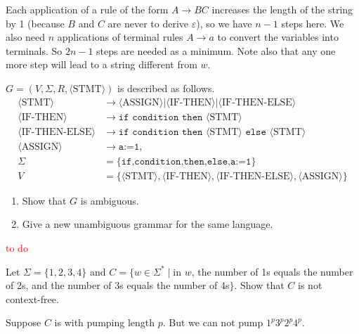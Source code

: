 Each application of a rule of the form $A\to BC$ increases the length of the string by 1 (because $B$ and $C$ are never to derive $\varepsilon$), so we have $n-1$ steps here. We also need $n$ applications of terminal rules $A\to a$ to convert the variables into terminals. So $2n-1$ steps are needed as a minimum. Note also that any one more step will lead to a string different from $w$.

\begin{exercise}{2.27}
  $G=(V,\Sigma,R,\langle \text{STMT}\rangle)$ is described as follows.
  \begin{align*}
    \langle \text{STMT}\rangle         & \rightarrow\langle \text{ASSIGN}\rangle|\langle \text{IF-THEN}\rangle|\langle \text{IF-THEN-ELSE}\rangle                  \\
    \langle \text{IF-THEN}\rangle      & \rightarrow \texttt{if condition then }\langle \text{STMT}\rangle                                                         \\
    \langle \text{IF-THEN-ELSE}\rangle & \rightarrow\texttt{if condition then }\langle \text{STMT}\rangle\texttt{ else }\langle \text{STMT}\rangle                 \\
    \langle \text{ASSIGN}\rangle       & \rightarrow\texttt{a:=1},                                                                                                 \\
    \Sigma                             & =\{\texttt{if,condition,then,else,a:=1}\}                                                                                 \\
    V                                  & =\{\langle\text{STMT}\rangle,\langle\text{IF-THEN}\rangle,\langle\text{IF-THEN-ELSE}\rangle,\langle\text{ASSIGN}\rangle\}
  \end{align*}
  \begin{enumerate}[label=(\alph*)]
    \item Show that $G$ is ambiguous.
    \item Give a new unambiguous grammar for the same language.\qedhere
  \end{enumerate}
\end{exercise}

\textcolor{red}{to do}

\setcounter{exercise}{31}

\begin{exercise}{2.32}
  Let $\Sigma = \{1, 2, 3, 4\}$ and $C = \{ w \in \Sigma^* \mid \text{in } w$, the number of 1s equals the number of 2s, and the number of 3s equals the number of 4s$\}$. Show that $C$ is not context-free.
\end{exercise}

Suppose $C$ is with pumping length $p$. But we can not pump $1^p3^p2^p4^p$.

